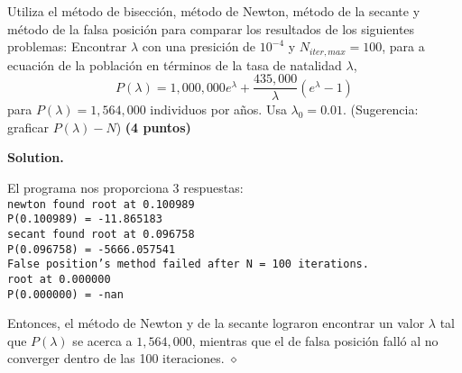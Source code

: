 \documentclass{article}
\theoremstyle{problemstyle}
\newenvironment{solution}{%
  \begin{mdframed}[linewidth=0.8pt,linecolor=Gray,backgroundcolor=Gray!5,roundcorner=5pt]%
  \noindent\textbf{Solution.}%
}{%
\hfill $ \diamond $ 
  \end{mdframed}%
}
\begin{document}
\begin{problem}
Utiliza el m\'etodo de bisecci\'on, m\'etodo de Newton, m\'etodo de la secante y m\'etodo de la falsa posici\'on para comparar los resultados de los siguientes problemas:
Encontrar $ \lambda $ con una presici\'on de $ 10^{-4} $ y $ N_{iter, max} = 100 $, para a ecuaci\'on de la poblaci\'on en t\'erminos de la tasa de natalidad $ \lambda $,
\[
	P(\lambda) = 1,000,000 e^{\lambda} + \frac{435,000}{\lambda}(e^{\lambda} - 1)
\]
para $ P(\lambda) = 1,564,000 $ individuos por a\~nos. Usa $ \lambda_0 = 0.01 $. (Sugerencia: graficar $ P(\lambda) - N $) \textbf{(4 puntos)}
\end{problem}

\begin{solution}
	
	El programa nos proporciona 3 respuestas:\\
	\texttt{newton found root at 0.100989}\\
	\texttt{P(0.100989) = -11.865183}\\
	\texttt{secant found root at 0.096758}\\
	\texttt{P(0.096758) = -5666.057541}\\
	\texttt{False position's method failed after N = 100 iterations.}\\
	\texttt{root at 0.000000}\\
	\texttt{P(0.000000) = -nan}

	Entonces, el m\'etodo de Newton y de la secante lograron encontrar un valor $ \lambda $ tal que $ P(\lambda)$ se acerca a $1,564,000 $, mientras que el de falsa posici\'on fall\'o al no converger dentro de las 100 iteraciones.
\end{solution}
\end{document}
